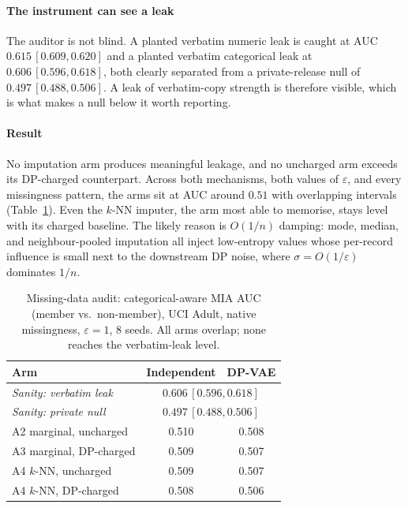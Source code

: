 \documentclass[conference]{IEEEtran}
\newcommand{\eps}{\varepsilon}
\begin{document}
\paragraph{The instrument can see a leak} The auditor is not blind. A planted verbatim numeric leak is
caught at AUC $0.615\,[0.609,0.620]$ and a planted verbatim categorical leak at $0.606\,[0.596,0.618]$,
both clearly separated from a private-release null of $0.497\,[0.488,0.506]$. A leak of verbatim-copy
strength is therefore visible, which is what makes a null below it worth reporting.

\paragraph{Result} No imputation arm produces meaningful leakage, and no uncharged arm exceeds its
DP-charged counterpart. Across both mechanisms, both values of $\eps$, and every missingness pattern,
the arms sit at AUC around $0.51$ with overlapping intervals (Table~\ref{tab:imp}). Even the $k$-NN
imputer, the arm most able to memorise, stays level with its charged baseline. The likely reason is
$O(1/n)$ damping: mode, median, and neighbour-pooled imputation all inject low-entropy values whose
per-record influence is small next to the downstream DP noise, where $\sigma=O(1/\eps)$ dominates
$1/n$.

\begin{table}[t]
\caption{Missing-data audit: categorical-aware MIA AUC (member vs.\ non-member), UCI Adult, native
missingness, $\eps{=}1$, $8$ seeds. All arms overlap; none reaches the verbatim-leak level.}
\label{tab:imp}
\centering
\begin{tabular}{lcc}
\toprule
Arm & Independent & DP-VAE \\
\midrule
\emph{Sanity: verbatim leak} & \multicolumn{2}{c}{$0.606\,[0.596,0.618]$} \\
\emph{Sanity: private null}  & \multicolumn{2}{c}{$0.497\,[0.488,0.506]$} \\
\midrule
A2 marginal, uncharged        & 0.510 & 0.508 \\
A3 marginal, DP-charged       & 0.509 & 0.507 \\
A4 $k$-NN, uncharged          & 0.509 & 0.507 \\
A4 $k$-NN, DP-charged         & 0.508 & 0.506 \\
\bottomrule
\end{tabular}
\end{table}
\end{document}
